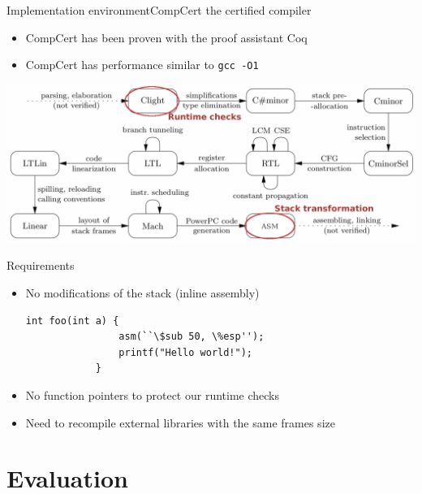 \documentclass{beamer}
\begin{document}
\begin{frame}[c]{Implementation environment}{CompCert the certified compiler~\cite{Leroy:2009:FVR:1538788.1538814}}
	\begin{itemize}
		\item CompCert has been proven with the proof assistant Coq
		\item CompCert has performance similar to \texttt{gcc -O1}
	\end{itemize}
	\hfill \break
	\includegraphics[width=\textwidth]{images/compcert_pass.pdf}
\end{frame}

\begin{frame}[fragile]{Requirements}
	\begin{itemize}
		\item No modifications of the stack (inline assembly)
			\begin{lstlisting}[tabsize=2,frame=single,linewidth=7cm]
			int foo(int a) {
				asm(``\$sub 50, \%esp'');
				printf("Hello world!");
			}
			\end{lstlisting}
		\item No function pointers to protect our runtime checks
		\item Need to recompile external libraries with the same frames size
	\end{itemize}
\end{frame}

\section{Evaluation}
\label{sec:Implementation}
\end{document}
